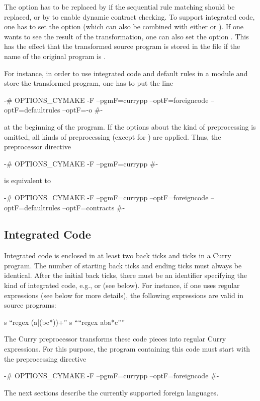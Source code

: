The option  has to be replaced by
 if the sequential rule matching should be replaced,
or by  to enable dynamic contract checking.
To support integrated code, one has to set the option
 (which can also be combined with
either  or ).
If one wants to see the result of the transformation, one can
also set the option . This has the effect that the
transformed source program is stored in the file
 if the name of the original program
is .

For instance, in order to use integrated code and default rules
in a module and store the transformed program,
one has to put the line
\begin{curry}
{-# OPTIONS_CYMAKE -F --pgmF=currypp --optF=foreigncode --optF=defaultrules --optF=-o #-}
\end{curry}
at the beginning of the program.
%
If the options about the kind of preprocessing is omitted,
all kinds of preprocessing (except for )
are applied. Thus, the preprocessor directive
\begin{curry}
{-# OPTIONS_CYMAKE -F --pgmF=currypp #-}
\end{curry}
is equivalent to
\begin{curry}
{-# OPTIONS_CYMAKE -F --pgmF=currypp --optF=foreigncode --optF=defaultrules --optF=contracts #-}
\end{curry}


\subsection{Integrated Code}

Integrated code is enclosed in at least two back ticks and ticks
in a Curry program. The number of starting back ticks and ending ticks
must always be identical.
After the initial back ticks, there must be an identifier
specifying the kind of integrated code,
e.g.,  or  (see below).
For instance, if one uses regular expressions (see below for more details),
the following expressions are valid in source programs:
\begin{curry}
  s ``regex (a|(bc*))+''
  s ````regex aba*c''''
\end{curry}
The Curry preprocessor transforms these code pieces into regular
Curry expressions.
For this purpose, the program containing this code must start with
the preprocessing directive
\begin{curry}
{-# OPTIONS_CYMAKE -F --pgmF=currypp --optF=foreigncode #-}
\end{curry}
%
The next sections describe the currently supported foreign languages.



